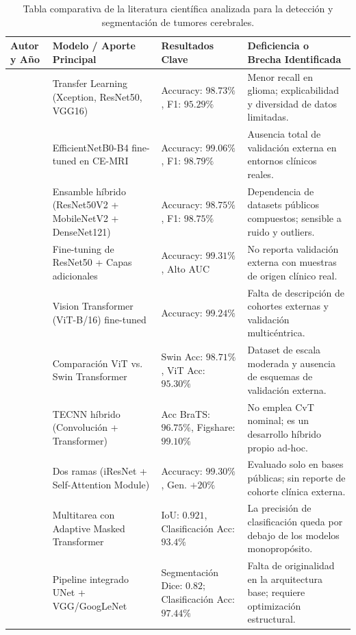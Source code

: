 \begin{table}[htbp]
  \caption{Tabla comparativa de la literatura científica analizada para la detección y segmentación de tumores cerebrales.}
  \label{tab:related_work_summary}
  \centering
  \begin{tabular}{p{} p{} p{} p{}}
    \hline
    \textbf{Autor y Año} & \textbf{Modelo / Aporte Principal} & \textbf{Resultados Clave} & \textbf{Deficiencia o Brecha Identificada} \\
    \hline
    \cite{Disci2025} & Transfer Learning (Xception, ResNet50, VGG16) & Accuracy: $98.73\%$, F1: $95.29\%$ & Menor recall en glioma; explicabilidad y diversidad de datos limitadas. \\
    \cite{BabuVimala2023} & EfficientNetB0-B4 fine-tuned en CE-MRI & Accuracy: $99.06\%$, F1: $98.79\%$ & Ausencia total de validación externa en entornos clínicos reales. \\
    \cite{DwiPrayogo2025} & Ensamble híbrido (ResNet50V2 + MobileNetV2 + DenseNet121) & Accuracy: $98.75\%$, F1: $98.75\%$ & Dependencia de datasets públicos compuestos; sensible a ruido y outliers. \\
    \cite{Mitra2025} & Fine-tuning de ResNet50 + Capas adicionales & Accuracy: $99.31\%$, Alto AUC & No reporta validación externa con muestras de origen clínico real. \\
    \cite{Panigrahi2025} & Vision Transformer (ViT-B/16) fine-tuned & Accuracy: $99.24\%$ & Falta de descripción de cohortes externas y validación multicéntrica. \\
    \cite{Jain2025} & Comparación ViT vs. Swin Transformer & Swin Acc: $98.71\%$, ViT Acc: $95.30\%$ & Dataset de escala moderada y ausencia de esquemas de validación externa. \\
    \cite{Aloraini2023} & TECNN híbrido (Convolución + Transformer) & Acc BraTS: $96.75\%$, Figshare: $99.10\%$ & No emplea CvT nominal; es un desarrollo híbrido propio ad-hoc. \\
    \cite{Tabatabaei2023} & Dos ramas (iResNet + Self-Attention Module) & Accuracy: $99.30\%$, Gen. $+20\%$ & Evaluado solo en bases públicas; sin reporte de cohorte clínica externa. \\
    \cite{Lv2025} & Multitarea con Adaptive Masked Transformer & IoU: $0.921$, Clasificación Acc: $93.4\%$ & La precisión de clasificación queda por debajo de los modelos monopropósito. \\
    \cite{Dang2022} & Pipeline integrado UNet + VGG/GoogLeNet & Segmentación Dice: $0.82$; Clasificación Acc: $97.44\%$ & Falta de originalidad en la arquitectura base; requiere optimización estructural. \\
    \hline
  \end{tabular}
\end{table}
